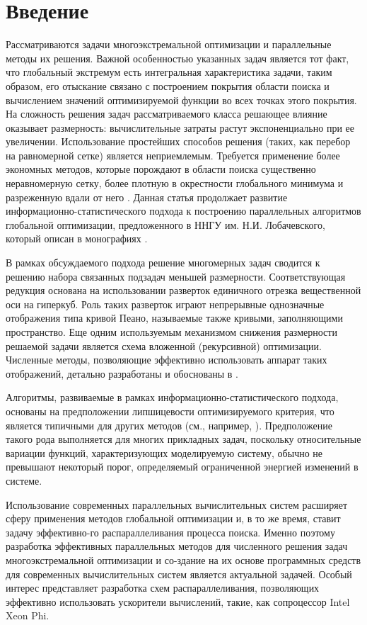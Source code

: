 \section{Введение}
Рассматриваются задачи многоэкстремальной оптимизации и параллельные методы их решения. Важной особенностью указанных задач является тот факт, что глобальный экстремум есть интегральная характеристика задачи, таким образом, его отыскание связано с построением покрытия области поиска и вычислением значений оптимизируемой функции во всех точках этого покрытия. На сложность решения задач рассматриваемого класса решающее влияние оказывает размерность: вычислительные затраты растут экспоненциально при ее увеличении. Использование простейших способов решения (таких, как перебор на равномерной сетке) является неприемлемым. Требуется применение более экономных методов, которые порождают в области поиска существенно неравномерную сетку, более плотную в окрестности глобального минимума и разреженную вдали от него \cite{evtushenko}\cite{pinter}\cite{sergKvaDiag}. Данная статья продолжает развитие информационно-статистического подхода к построению параллельных алгоритмов глобальной оптимизации, предложенного в ННГУ им. Н.И. Лобачевского, который описан в монографиях \cite{strSergOptBook}\cite{strGergrParOptBook}.
\par
В рамках обсуждаемого подхода решение многомерных задач сводится к решению набора связанных подзадач меньшей размерности. Соответствующая редукция основана на использовании разверток единичного отрезка вещественной оси на гиперкуб. Роль таких разверток играют непрерывные однозначные отображения типа кривой Пеано, называемые также кривыми, заполняющими пространство. Еще одним используемым механизмом снижения размерности решаемой задачи является схема вложенной (рекурсивной) оптимизации. Численные методы, позволяющие эффективно использовать аппарат таких отображений, детально разработаны и обоснованы в \cite{strSergOptBook}\cite{strGergrParOptBook}.
\par
Алгоритмы, развиваемые в рамках информационно-статистического подхода, основаны на предположении липшицевости оптимизируемого критерия, что является типичными для других методов (см., например, \cite{pinter}\cite{sergKvaDiag}). Предположение такого рода выполняется для многих прикладных задач, поскольку относительные вариации функций, характеризующих моделируемую систему, обычно не превышают некоторый порог, определяемый ограниченной энергией изменений в системе.
\par
Использование современных параллельных вычислительных систем расширяет сферу применения методов глобальной оптимизации и, в то же время, ставит задачу эффективно-го распараллеливания процесса поиска. Именно поэтому разработка эффективных параллельных методов для численного решения задач многоэкстремальной оптимизации и со-здание на их основе программных средств для современных вычислительных систем является актуальной задачей. Особый интерес представляет разработка схем распараллеливания, позволяющих эффективно использовать ускорители вычислений, такие, как сопроцессор Intel Xeon Phi.
